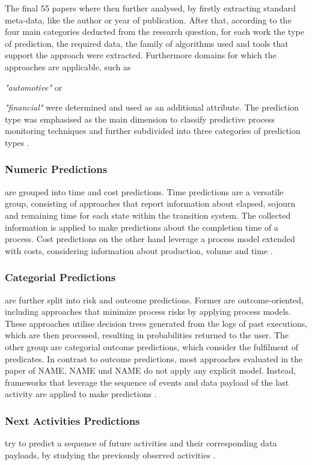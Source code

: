 \documentclass{llncs}
\begin{document}
{{{{The final 55 papers where then further analysed, by firstly extracting standard meta-data, like the author or year of publication.
After that, according to the four main categories deducted from the research question, for each work the type of prediction, the required data, the family of 
algorithms used and tools that support the approach were extracted. Furthermore domains for which the approaches are applicable, such as {\textit{"automotive"} 
or {\textit{"financial"} were determined and used as an additional attribute. The prediction type was emphasised as the main dimension to classify predictive 
process monitoring techniques and further subdivided into three categories of prediction types \cite{di2018predictive}.

\subsubsection{Numeric Predictions} are grouped into time and cost predictions. Time predictions are a versatile group, consisting of approaches that report 
information about elapsed, sojourn and remaining time for each state within the transition system. The collected information is applied to make predictions 
about the completion time of a process. Cost predictions on the other hand leverage a process model extended with costs, considering information about production, volume and time \cite{di2018predictive}.

\subsubsection{Categorial Predictions} are further split into risk and outcome predictions. Former are outcome-oriented, including approaches that minimize process risks by 
applying process models. These approaches utilise decision trees generated from the logs of past executions, which are then processed, resulting in 
probabilities returned to the user. The other group are categorial outcome predictions, which consider the fulfilment of predicates. In contrast to outcome predictions, 
most approaches evaluated in the paper of NAME, NAME und NAME do not apply any explicit model. Instead, frameworks that leverage the sequence of events and data payload 
of the last activity are applied to make predictions \cite{di2018predictive}.

\subsubsection{Next Activities Predictions} try to predict a sequence of future activities and their corresponding data payloads, by studying the previously observed activities \cite{di2018predictive}.

}}}}}}
\end{document}
